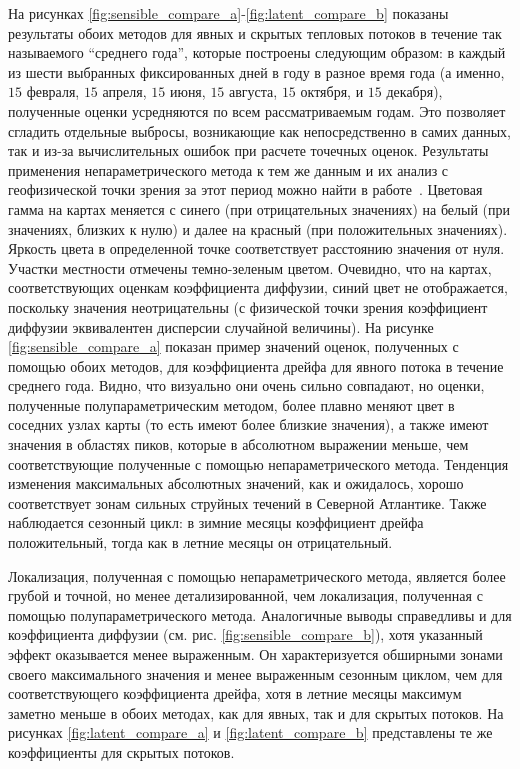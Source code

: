 На рисунках \ref{fig:sensible_compare_a}-\ref{fig:latent_compare_b} показаны результаты обоих методов для явных и скрытых тепловых потоков в течение так называемого “среднего года”, которые построены следующим образом: в каждый из шести выбранных фиксированных дней в году в разное время года (а именно, $15$ февраля, $15$ апреля, $15$ июня, $15$ августа, $15$ октября, и $15$ декабря), полученные оценки усредняются по всем рассматриваемым годам. Это позволяет сгладить отдельные выбросы, возникающие как непосредственно в самих данных, так и из-за вычислительных ошибок при расчете точечных оценок. Результаты применения непараметрического метода к тем же данным и их анализ с геофизической точки зрения за этот период можно найти в работе~\cite{gorshenin2023stochastic}.
Цветовая гамма на картах меняется с синего (при отрицательных значениях) на белый (при значениях, близких к нулю) и далее на красный (при положительных значениях). Яркость цвета в определенной точке соответствует расстоянию значения от нуля. Участки местности отмечены темно-зеленым цветом. Очевидно, что на картах, соответствующих оценкам коэффициента диффузии, синий цвет не отображается, поскольку значения неотрицательны (с физической точки зрения коэффициент диффузии эквивалентен дисперсии случайной величины).
На рисунке \ref{fig:sensible_compare_a} показан пример значений оценок, полученных с помощью обоих методов, для коэффициента дрейфа для явного потока в течение среднего года. Видно, что визуально они очень сильно совпадают, но оценки, полученные полупараметрическим методом, более плавно меняют цвет в соседних узлах карты (то есть имеют более близкие значения), а также имеют значения в областях пиков, которые в абсолютном выражении меньше, чем соответствующие полученные с помощью непараметрического метода. Тенденция изменения максимальных абсолютных значений, как и ожидалось, хорошо соответствует зонам сильных струйных течений в Северной Атлантике. Также наблюдается сезонный цикл: в зимние месяцы коэффициент дрейфа положительный, тогда как в летние месяцы он отрицательный.

Локализация, полученная с помощью непараметрического метода, является более грубой и точной, но менее детализированной, чем локализация, полученная с помощью полупараметрического метода. Аналогичные выводы справедливы и для коэффициента диффузии (см. рис. \ref{fig:sensible_compare_b}), хотя указанный эффект оказывается менее выраженным. Он характеризуется обширными зонами своего максимального значения и менее выраженным сезонным циклом, чем для соответствующего коэффициента дрейфа, хотя в летние месяцы максимум заметно меньше в обоих методах, как для явных, так и для скрытых потоков. На рисунках \ref{fig:latent_compare_a} и \ref{fig:latent_compare_b} представлены те же коэффициенты для скрытых потоков.

